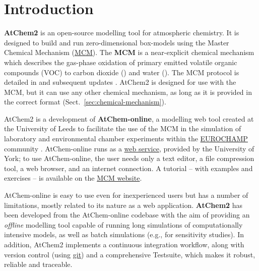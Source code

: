 %
%
%
%

\chapter{Introduction} \label{ch:introduction}

\textbf{AtChem2} is an open-source modelling tool for atmospheric chemistry. It is designed to
build and run zero-dimensional box-models using the Master Chemical Mechanism
(\href{https://mcm.york.ac.uk/MCM}{MCM}). The \textbf{MCM} is a near-explicit chemical
mechanism which describes the gas-phase oxidation of primary emitted volatile organic compounds
(VOC) to carbon dioxide () and water (). The MCM protocol is detailed in
\citet{jenkin_1997} and subsequent updates \citep{saunders_2003, jenkin_2003, bloss_2005,
  jenkin_2012, jenkin_2015}. AtChem2 is designed for use with the MCM, but it can use any other
chemical mechanism, as long as it is provided in the correct format
(Sect.~\ref{sec:chemical-mechanism}).

AtChem2 is a development of \textbf{AtChem-online}, a modelling web tool created at the
University of Leeds to facilitate the use of the MCM in the simulation of laboratory and
environmental chamber experiments within the \href{https://www.eurochamp.org}{EUROCHAMP}
community \citep{martin_2009}. AtChem-online runs as a \href{https://atchem.york.ac.uk}{web
  service}, provided by the University of York; to use AtChem-online, the user needs only a
text editor, a file compression tool, a web browser, and an internet connection. A tutorial --
with examples and exercises -- is available on the
\href{https://mcm.york.ac.uk/MCM/atchemonline/intro}{MCM website}.

AtChem-online is easy to use even for inexperienced users but has a number of limitations,
mostly related to its nature as a web application. \textbf{AtChem2} has been developed from the
AtChem-online codebase with the aim of providing an \emph{offline} modelling tool capable of
running long simulations of computationally intensive models, as well as batch simulations
(e.g., for sensitivity studies). In addition, AtChem2 implements a continuous integration
workflow, along with version control (using \href{https://git-scm.com}{git}) and a
comprehensive Testsuite, which makes it robust, reliable and traceable.

